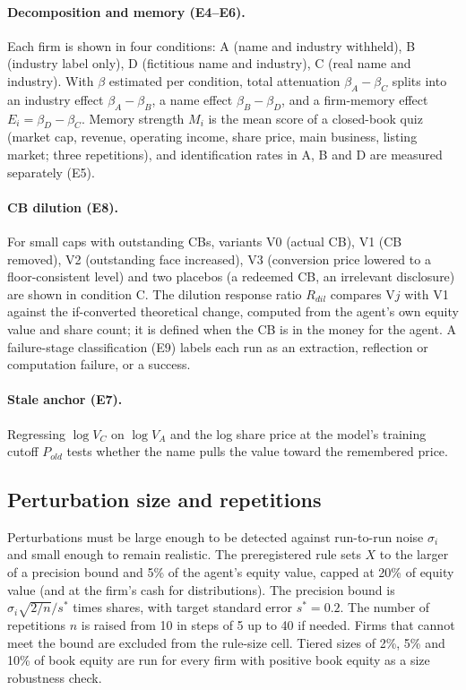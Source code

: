 \documentclass[11pt]{article}
\begin{document}
\paragraph{Decomposition and memory (E4--E6).} Each firm is shown in four conditions: A (name and industry withheld), B (industry label only), D (fictitious name and industry), C (real name and industry). With $\beta$ estimated per condition, total attenuation $\beta_A-\beta_C$ splits into an industry effect $\beta_A-\beta_B$, a name effect $\beta_B-\beta_D$, and a firm-memory effect $E_i=\beta_D-\beta_C$. Memory strength $M_i$ is the mean score of a closed-book quiz (market cap, revenue, operating income, share price, main business, listing market; three repetitions), and identification rates in A, B and D are measured separately (E5).

\paragraph{CB dilution (E8).} For small caps with outstanding CBs, variants V0 (actual CB), V1 (CB removed), V2 (outstanding face increased), V3 (conversion price lowered to a floor-consistent level) and two placebos (a redeemed CB, an irrelevant disclosure) are shown in condition C. The dilution response ratio $R_{dil}$ compares V$j$ with V1 against the if-converted theoretical change, computed from the agent's own equity value and share count; it is defined when the CB is in the money for the agent. A failure-stage classification (E9) labels each run as an extraction, reflection or computation failure, or a success.

\paragraph{Stale anchor (E7).} Regressing $\log V_C$ on $\log V_A$ and the log share price at the model's training cutoff $P_{old}$ tests whether the name pulls the value toward the remembered price.

\subsection{Perturbation size and repetitions}

Perturbations must be large enough to be detected against run-to-run noise $\sigma_i$ and small enough to remain realistic. The preregistered rule sets $X$ to the larger of a precision bound and 5\% of the agent's equity value, capped at 20\% of equity value (and at the firm's cash for distributions). The precision bound is $\sigma_i\sqrt{2/n}/s^*$ times shares, with target standard error $s^*=0.2$. The number of repetitions $n$ is raised from 10 in steps of 5 up to 40 if needed. Firms that cannot meet the bound are excluded from the rule-size cell. Tiered sizes of 2\%, 5\% and 10\% of book equity are run for every firm with positive book equity as a size robustness check.
\end{document}
